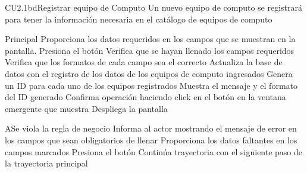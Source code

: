 \begin{UseCase}{CU2.1bd}{Registrar equipo de Computo}{
	Un nuevo equipo de computo se registrará para tener la información necesaria en el catálogo de equipos de computo
}
{\begin{itemize}
			\end{itemize}			
		}
\end{UseCase}


\begin{UCtrayectoria}{Principal}
		\UCpaso[\UCactor] Proporciona los datos requeridos en los campos que se muestran en la pantalla.
		\UCpaso[\UCactor] Presiona el botón  
		\UCpaso[\UCsist] Verifica que se hayan llenado los campos requeridos 
		\UCpaso[\UCsist] Verifica que los formatos de cada campo sea el correcto 
		\UCpaso[\UCsist] Actualiza la base de datos con el registro de los datos de los equipos de computo ingresados 
		\UCpaso[\UCsist] Genera un ID para cada uno de los equipos registrados
		\UCpaso[\UCsist] Muestra el mensaje  y el formato del ID generado
		\UCpaso[\UCactor] Confirma operación haciendo click en el botón  en la ventana emergente que muestra
		\UCpaso[\UCsist] Despliega la pantalla 
\end{UCtrayectoria}



\begin{UCtrayectoriaA}{A}{Se viola la regla de negocio }	
			\UCpaso[\UCsist] Informa al actor mostrando el mensaje de error  en los campos que sean obligatorios de llenar
			\UCpaso[\UCactor] Proporciona los datos faltantes en los campos marcados 
			\UCpaso[\UCactor] Presiona el botón   
			\UCpaso[\UCsist] Continúa trayectoria con el siguiente paso de la trayectoria principal 
\end{UCtrayectoriaA}

